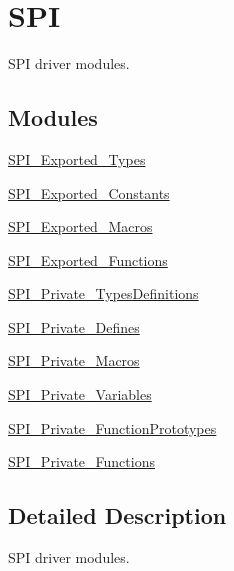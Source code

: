 \hypertarget{group___s_p_i}{}\section{S\+PI}
\label{group___s_p_i}


S\+PI driver modules.  


\subsection*{Modules}
\begin{DoxyCompactItemize}
\item 
\mbox{\hyperlink{group___s_p_i___exported___types}{S\+P\+I\+\_\+\+Exported\+\_\+\+Types}}
\item 
\mbox{\hyperlink{group___s_p_i___exported___constants}{S\+P\+I\+\_\+\+Exported\+\_\+\+Constants}}
\item 
\mbox{\hyperlink{group___s_p_i___exported___macros}{S\+P\+I\+\_\+\+Exported\+\_\+\+Macros}}
\item 
\mbox{\hyperlink{group___s_p_i___exported___functions}{S\+P\+I\+\_\+\+Exported\+\_\+\+Functions}}
\item 
\mbox{\hyperlink{group___s_p_i___private___types_definitions}{S\+P\+I\+\_\+\+Private\+\_\+\+Types\+Definitions}}
\item 
\mbox{\hyperlink{group___s_p_i___private___defines}{S\+P\+I\+\_\+\+Private\+\_\+\+Defines}}
\item 
\mbox{\hyperlink{group___s_p_i___private___macros}{S\+P\+I\+\_\+\+Private\+\_\+\+Macros}}
\item 
\mbox{\hyperlink{group___s_p_i___private___variables}{S\+P\+I\+\_\+\+Private\+\_\+\+Variables}}
\item 
\mbox{\hyperlink{group___s_p_i___private___function_prototypes}{S\+P\+I\+\_\+\+Private\+\_\+\+Function\+Prototypes}}
\item 
\mbox{\hyperlink{group___s_p_i___private___functions}{S\+P\+I\+\_\+\+Private\+\_\+\+Functions}}
\end{DoxyCompactItemize}


\subsection{Detailed Description}
S\+PI driver modules. 

